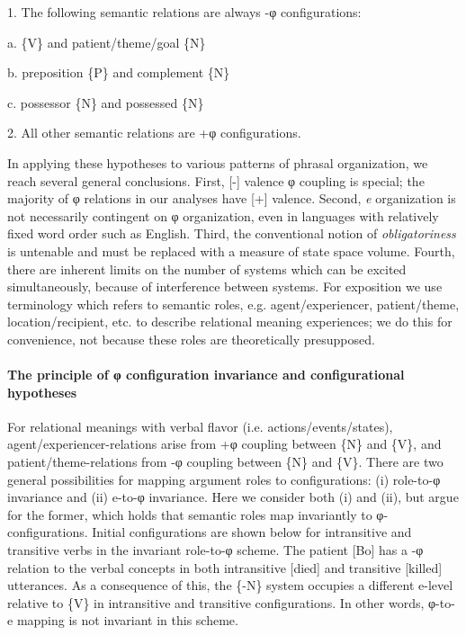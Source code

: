 1. The following semantic relations are always -φ configurations:

  a. \{V\} and patient/theme/goal \{N\}

  b. preposition \{P\} and complement \{N\}

  c. possessor \{N\} and possessed \{N\}

2. All other semantic relations are +φ configurations.

  In applying these hypotheses to various patterns of phrasal organization, we reach several general conclusions. First, [-] valence φ coupling is special; the majority of φ relations in our analyses have [+] valence. Second, \textit{e} organization is not necessarily contingent on φ organization, even in languages with relatively fixed word order such as English. Third, the conventional notion of \textit{obligatoriness} is untenable and must be replaced with a measure of state space volume. Fourth, there are inherent limits on the number of systems which can be excited simultaneously, because of interference between systems. For exposition we use terminology which refers to semantic roles, e.g. agent/experiencer, patient/theme, location/recipient, etc. to describe relational meaning experiences; we do this for convenience, not because these roles are theoretically presupposed.

\paragraph{The principle of \textup{φ configuration} invariance and configurational hypotheses}

For relational meanings with verbal flavor (i.e. actions/events/states), agent/experiencer-relations arise from +φ coupling between \{N\} and \{V\}, and patient/theme-relations from -φ coupling between \{N\} and \{V\}. There are two general possibilities for mapping argument roles to configurations: (i) role-to-φ invariance and (ii) e-to-φ invariance. Here we consider both (i) and (ii), but argue for the former, which holds that semantic roles map invariantly to φ-configurations. Initial configurations are shown below for intransitive and transitive verbs in the invariant role-to-φ scheme. The patient [Bo] has a -φ relation to the verbal concepts in both intransitive [died] and transitive [killed] utterances. As a consequence of this, the \{-N\} system occupies a different e-level relative to \{V\} in intransitive and transitive configurations. In other words, φ-to-e mapping is not invariant in this scheme.

